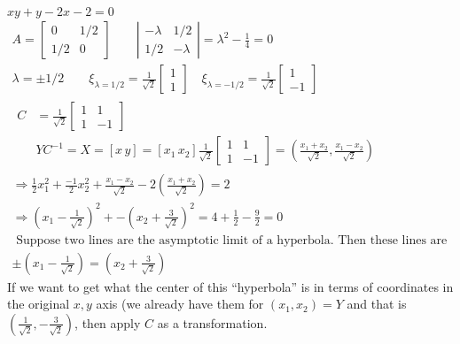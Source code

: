 \documentclass[twoside]{amsart}
\theoremstyle{plain}
\theoremstyle{definition}
\newcommand{\exercisehead}[1]
  {
   \noindent{\small\bf Exercise #1.}
   \smallskip}
\begin{document}
\exercisehead{18} $xy + y - 2x - 2 = 0$  
\[
\begin{gathered}
  A = \left[ \begin{matrix} 0  & 1/2 \\ 1/2 & 0 \end{matrix} \right] \quad \quad \left| \begin{matrix} - \lambda & 1/2 \\ 1/2 & -\lambda \end{matrix} \right| = \lambda^2 - \frac{1}{4} = 0 \quad \quad \\ 
  \lambda = \pm 1/2 \quad \quad \xi_{\lambda = 1/2} = \frac{1}{ \sqrt{2}} \left[ \begin{matrix} 1 \\ 1 \end{matrix} \right] \quad \xi_{\lambda = -1/2} = \frac{1}{\sqrt{2}} \left[ \begin{matrix} 1 \\ -1 \end{matrix} \right]  \\
    \begin{aligned}
      C & = \frac{1}{\sqrt{2}} \left[ \begin{matrix} 1 & 1 \\ 1 & -1 \end{matrix} \right] \\
      & YC^{-1} = X = [x \, y ] = [ x_1 \, x_2 ] \frac{1}{ \sqrt{2}} \left[ \begin{matrix} 1 & 1 \\ 1 & -1 \end{matrix} \right] = \left( \frac{ x_1 + x_2 }{ \sqrt{2} }, \frac{ x_1 - x_2}{ \sqrt{2}} \right) 
    \end{aligned} \\
    \Longrightarrow \frac{1}{2} x_1^2 + \frac{-1}{2} x_2^2 + \frac{x_1 - x_2}{ \sqrt{2} } - 2 \left( \frac{ x_1 + x_2}{ \sqrt{2} }\right) = 2 \\
    \Longrightarrow \left( x_1 - \frac{1}{\sqrt{2}} \right)^2 + - \left( x_2 + \frac{3}{\sqrt{2}} \right)^2 = 4 + \frac{1}{2} - \frac{9}{2} = 0 \\
 \text{ Suppose two lines are the asymptotic limit of a hyperbola.  Then these lines are ``hyperbolas.''  } \\
 \boxed{ \pm \left( x_1 - \frac{1}{ \sqrt{2}} \right) = \left( x_2 + \frac{3}{\sqrt{2}} \right) }
\end{gathered}
\]
If we want to get what the center of this ``hyperbola'' is in terms of coordinates in the original $x,y$ axis (we already have them for $(x_1,x_2)=Y$ and that is $\left( \frac{1}{\sqrt{2}}, -\frac{3}{\sqrt{2}} \right)$, then apply $C$ as a transformation.  
\end{document}

